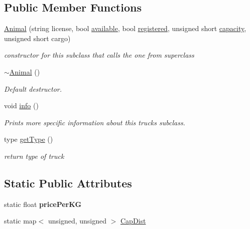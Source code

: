 \subsection*{Public Member Functions}
\begin{DoxyCompactItemize}
\item 
\hyperlink{class_animal_afdae9b8c4716472196e8cd62c762f88a}{Animal} (string license, bool \hyperlink{class_truck_a4189fe5ed32f6084459a9c5ae1eb7c2a}{available}, bool \hyperlink{class_truck_a80b8405cf7a15b236fef70116f99c4fb}{registered}, unsigned short \hyperlink{class_truck_ab004524786ae7aebf7c7bdb5e1599696}{capacity}, unsigned short cargo)
\begin{DoxyCompactList}\small\item\em constructor for this subclass that calls the one from superclass \end{DoxyCompactList}\item 
\hyperlink{class_animal_a476af25adde5f0dfa688129c8f86fa5c}{$\sim$\+Animal} ()
\begin{DoxyCompactList}\small\item\em Default destructor. \end{DoxyCompactList}\item 
void \hyperlink{class_animal_a1e99083943239209f4fbe79380ea5991}{info} ()
\begin{DoxyCompactList}\small\item\em Prints more specific information about this truck\textquotesingle{}s subclass. \end{DoxyCompactList}\item 
type \hyperlink{class_animal_a6e7f8a4a7e8e9571218e3650a0803c03}{get\+Type} ()
\begin{DoxyCompactList}\small\item\em return type of truck \end{DoxyCompactList}\end{DoxyCompactItemize}
\subsection*{Static Public Attributes}
\begin{DoxyCompactItemize}
\item 
\mbox{\label{class_animal_aa421a3d5192279ca552a62ab3e0517c2}} 
static float {\bfseries price\+Per\+KG}
\item 
static map$<$ unsigned, unsigned $>$ \hyperlink{class_animal_a6109c3aa008a556ed43318ae4bcf33a2}{Cap\+Dist}
\end{DoxyCompactItemize}
